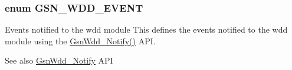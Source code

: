 \hypertarget{a00677_ga1ff070ddd12f2dfd9bc0e26f84b4888c}{
\subsubsection[{GSN\_\-WDD\_\-EVENT}]{\setlength{\rightskip}{0pt plus 5cm}enum {\bf GSN\_\-WDD\_\-EVENT}}}
\label{a00677_ga1ff070ddd12f2dfd9bc0e26f84b4888c}


Events notified to the wdd module This defines the events notified to the wdd module using the \hyperlink{a00677_ga3b57a234af35c0dc77fa3760a2f3f07f}{GsnWdd\_\-Notify()} API. 

\begin{DoxySeeAlso}{See also}
\hyperlink{a00677_ga3b57a234af35c0dc77fa3760a2f3f07f}{GsnWdd\_\-Notify} API 
\end{DoxySeeAlso}
